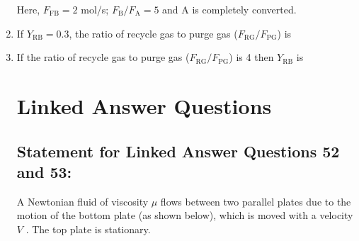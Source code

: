 \documentclass[journal,12pt,onecolumn]{IEEEtran}
\theoremstyle{remark}
\begin{document}
\begin{enumerate}
Here, $F_{\text{FB}} = 2$ mol/s; $F_{\text{B}} / F_{\text{A}} = 5$ and A is completely converted.

    \item If $Y_{\text{RB}} = 0.3$, the ratio of recycle gas to purge gas ($F_{\text{RG}}/F_{\text{PG}}$) is
    \hfill{}
    \begin{enumerate}
    \end{enumerate}
    
    \item If the ratio of recycle gas to purge gas ($F_{\text{RG}}/F_{\text{PG}}$) is 4 then $Y_{\text{RB}}$ is
    \hfill{}
    \begin{enumerate}
    \end{enumerate}

\section*{Linked Answer Questions}
\subsection*{Statement for Linked Answer Questions 52 and 53:}

A Newtonian fluid of viscosity $\mu$ flows between two parallel plates due to the motion of the bottom plate (as shown below), which is moved with a velocity $V$ . The top plate is stationary.


\end{enumerate}
\end{document}
